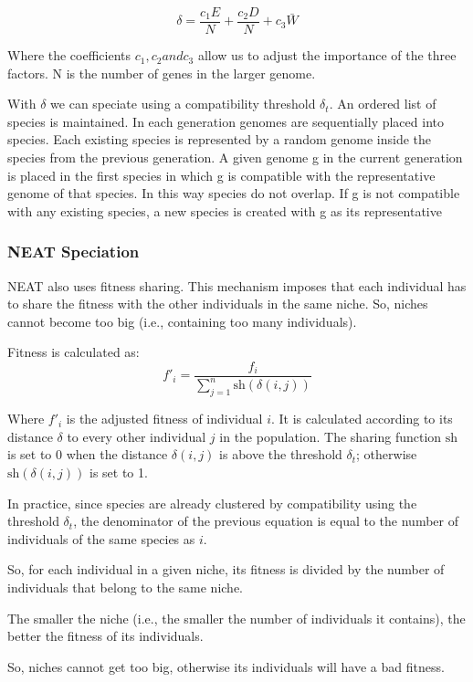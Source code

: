 \[
\delta = \frac{c_1E}{N} + \frac{c_2D}{N}+c_3 \bar{W}
\]


Where the coefficients $c_1, c_2 and c_3$ allow us to adjust the importance of the three factors. N is the number of genes in the larger genome. 

\vspace{10pt}

With $\delta$ we can speciate using a compatibility threshold $\delta_t$. An ordered list of species is maintained. In each generation genomes are sequentially placed into species. Each existing species is represented by a random genome inside the species from the previous generation. A given genome g in the current generation is placed in the first species in which g is compatible with the representative genome of that species. In this way species do not overlap. If g is not compatible with any existing species, a new species is created with g as its representative

\subsubsection{NEAT Speciation}

NEAT also uses fitness sharing. This mechanism imposes that each individual has to share the fitness with the other individuals in the same niche. So, niches cannot become too big (i.e., containing too many individuals).

Fitness is calculated as:
\begin{equation}
    f'_i = \frac{f_i}{\sum_{j=1}^{n} \text{sh}(\delta(i, j))}
\end{equation}

Where $f'_i$ is the adjusted fitness of individual $i$. It is calculated according to its distance $\delta$ to every other individual $j$ in the population. The sharing function $\text{sh}$ is set to 0 when the distance $\delta(i, j)$ is above the threshold $\delta_t$; otherwise $\text{sh}(\delta(i, j))$ is set to 1.

\vspace{1em}

In practice, since species are already clustered by compatibility using the threshold $\delta_t$, the denominator of the previous equation is equal to the number of individuals of the same species as $i$.

So, for each individual in a given niche, its fitness is divided by the number of individuals that belong to the same niche.

The smaller the niche (i.e., the smaller the number of individuals it contains), the better the fitness of its individuals.

So, niches cannot get too big, otherwise its individuals will have a bad fitness.




